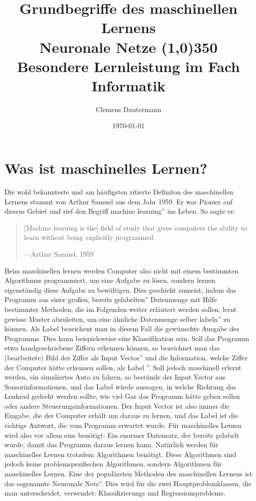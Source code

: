 \documentclass[11pt]{article}
\author{Clemens Dautermann}
\title{\Huge Grundbegriffe des maschinellen Lernens\\
	\bigskip
\huge Neuronale Netze \line(1,0){350}
\vspace*{10mm}
\Large Besondere Lernleistung im Fach Informatik
\vspace*{70mm}}
\date{\today{}}
\begin{document}
\biolinum
{}
\begin{titlepage}
	\maketitle
\end{titlepage}
\tableofcontents{}
\newpage

\section{Was ist maschinelles Lernen?}
Die wohl bekannteste und am häufigsten zitierte Definiton des maschinellen Lernens stammt von Arthur Samuel aus dem Jahr 1959. Er war Pionier auf diesem Gebiet und rief den Begriff \glqq machine learning'' ins Leben. So sagte er:
\begin{quote}
	[Machine learning is the] field of study that gives computers the ability to learn without being explicitly programmed\cite{1}.
	\begin{flushright}
		---Arthur Samuel, 1959
	\end{flushright}
\end{quote}
Beim maschinellen lernen werden Computer also nicht mit einem bestimmten Algorithmus programmiert, um eine Aufgabe zu lösen, sondern lernen eigenständig diese Aufgabe zu bewältigen. Dies geschieht zumeist, indem das Programm aus einer großen, bereits \glqq gelabelten'' Datenmenge mit Hilfe bestimmter Methoden, die im Folgenden weiter erläutert werden sollen, lernt gewisse Muster abzuleiten,  um eine ähnliche Datenmenge selber \glqq labeln'' zu können.  Als Label bezeichent man in diesem Fall die gewünschte Ausgabe des Programms. Dies kann beispielsweise eine Klassifikation sein. Soll das Programm etwa handgeschriebene Ziffern erkennen können, so bezeichnet man das (bearbeitete) Bild der Ziffer als \glqq Input Vector'' und die Information, welche Ziffer der Computer hätte erkennen sollen, als \glqq Label ''. Soll jedoch maschinell erlernt werden, ein simuliertes Auto zu fahren, so bestünde der Input Vector aus Sensorinformationen, und das Label würde aussagen, in welche Richtung das Lenkrad gedreht werden sollte, wie viel Gas das Programm hätte geben sollen oder andere Steuerungsinformationen. Der Input Vector ist also immer die Eingabe, die der Computer erhält um daraus zu lernen, und das Label ist die richtige Antwort, die vom Programm erwartet wurde. Für maschinelles Lernen wird also vor allem eins benötigt: Ein enormer Datensatz, der bereits gelabelt wurde, damit das Programm daraus lernen kann.\newline
Natürlich werden für maschinelles Lernen trotzdem Algorithmen benötigt. Diese Algorithmen sind jedoch keine problemspezifischen Algorithmen, sondern Algorithmen für maschinelles Lernen. Eine der populärsten Methoden des maschinellen Lernens ist das sogenannte \glqq Neuronale Netz''. Dies wird für die zwei Hauptproblemklassen, die man unterscheidet, verwendet: Klassifizierungs und Regressionsprobleme. 
\end{document}
